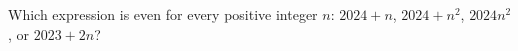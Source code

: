 Which expression is even for every positive integer $n$: $2024+n$, $2024+n^2$, $2024n^2$, or $2023+2n$?
